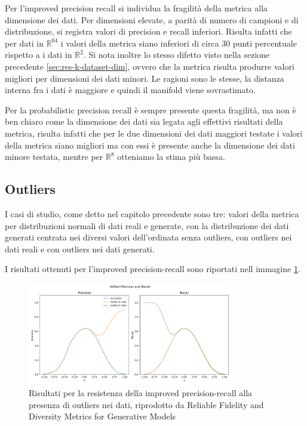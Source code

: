 Per l'improved precision recall si individua la fragilità della metrica alla dimensione dei dati. Per dimensioni elevate, a parità di numero di campioni e di distribuzione, si registra valori di precision e recall inferiori.
Risulta infatti che per dati in \(\mathbb{R}^{64}\) i valori della metrica siano inferiori di circa 30 punti percentuale rispetto a i dati in  \(\mathbb{R}^{2}\). Si nota inoltre lo stesso difetto visto nella sezione precedente \ref{sec:res-k-dataset-dim}, ovvero che la metrica risulta produrre valori migliori per dimensioni dei dati minori.
Le ragioni sono le stesse, la distanza interna fra i dati è maggiore e quindi il manifold viene sovrastimato.

Per la probabilistic precision recall è sempre presente questa fragilità, ma non è ben chiaro come la dimensione dei dati sia legata agli effettivi risultati della metrica, risulta infatti che per le due dimensioni dei dati maggiori
testate i valori della metrica siano migliori ma con essi è presente anche la dimensione dei dati minore testata, mentre per \(\mathbb{R}^{8}\) otteniamo la stima più bassa.

\subsection{Outliers}
\label{sec:res-outliers}

I casi di studio, come detto nel capitolo precedente sono tre: valori della metrica per distribuzioni normali di dati reali e generate, con la distribuzione dei dati generati centrata nei diversi valori dell'ordinata senza outliers, con outliers nei dati reali e con outliers nei dati generati.

I risultati ottenuti per l'improved precision-recall sono riportati nell immagine \ref{fig:toyexperiments-outliers}. 

\begin{figure}[!ht]
    \label{fig:toyexperiments-outliers}
    \centering
    \includegraphics[width=0.8\textwidth]{../images/toyexperiments/outliers/shift_iPrecision_iRecall.png} 
    \caption{Risultati per la resistenza della improved precision-recall alla presenza di outliers nei dati, riprodotto da Reliable Fidelity and Diversity Metrics for Generative Models \cite{3ReliableFidelityDiversityMetrics}}
\end{figure}

